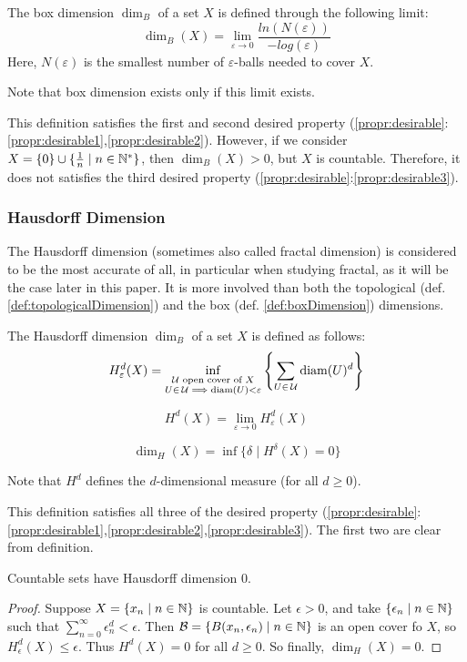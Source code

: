 \begin{definition}\label{def:boxDimension}
	The box dimension $\dim_B$ of a set $X$ is defined through the following limit:
	$$
	\dim_B(X) = \lim_{\varepsilon \to 0} \frac{ln(N(\varepsilon))}{-log(\varepsilon)}
	$$
	Here, $N(\varepsilon)$ is the smallest number of $\varepsilon$-balls needed to cover $X$.
	
	Note that box dimension exists only if this limit exists.
\end{definition}

This definition satisfies the first and second desired property (\ref{propr:desirable}:\ref{propr:desirable1},\ref{propr:desirable2}).
However, if we consider $X = \{0\} \cup \{\frac{1}{n} \mid n \in \mathbb{N}^*\}$, then $\dim_B(X) > 0$, but $X$ is countable.
Therefore, it does not satisfies the third desired property (\ref{propr:desirable}:\ref{propr:desirable3}).

\subsubsection{Hausdorff Dimension}
The Hausdorff dimension (sometimes also called fractal dimension) is considered to be the most accurate of all, in particular when studying fractal, as it will be the case later in this paper.
It is more involved than both the topological (def. \ref{def:topologicalDimension}) and the box (def. \ref{def:boxDimension}) dimensions.

\begin{definition}\label{def:HausdorffDimension}
	The Hausdorff dimension $\dim_B$ of a set $X$ is defined as follows:
	$$
	H_{\varepsilon}^d(X) = 
	\inf_{\substack{\mathcal{U} \text{ open cover of } X\\
			U \in \, \mathcal{U} \implies \text{diam}(U) < \varepsilon}}
		\left\lbrace \sum_{U \in \, \mathcal{U}} \text{diam}(U)^d \right\rbrace
	$$
	
	$$
	H^d(X) = \lim_{\varepsilon \to 0} H_{\varepsilon}^d(X)
	$$
	
	$$
	\dim_H(X) = \inf \{ \delta \mid H^{\delta}(X) = 0 \}
	$$
	
	Note that $H^d$ defines the $d$-dimensional measure (for all $d \geq 0$).
\end{definition}

This definition satisfies all three of the desired property (\ref{propr:desirable}:\ref{propr:desirable1},\ref{propr:desirable2},\ref{propr:desirable3}).
The first two are clear from definition.
\begin{property}
	Countable sets have Hausdorff dimension 0.
\end{property}
\begin{proof}
	Suppose $X = \{ x_n \mid n \in \mathbb{N} \}$ is countable.
	Let $\epsilon > 0$, and take $\{ \epsilon_n \mid n \in \mathbb{N} \}$ such that $\sum_{n=0}^{\infty} \epsilon_n^d < \epsilon$.
	Then $\mathcal{B} = \{ B(x_n,\epsilon_n) \mid n \in \mathbb{N} \}$ is an open cover fo $X$, so $H_{\epsilon}^d(X) \leq \epsilon$.
	Thus $H^d(X) = 0$ for all $d \geq 0$.
	So finally, $\dim_H(X) = 0$.
\end{proof}

